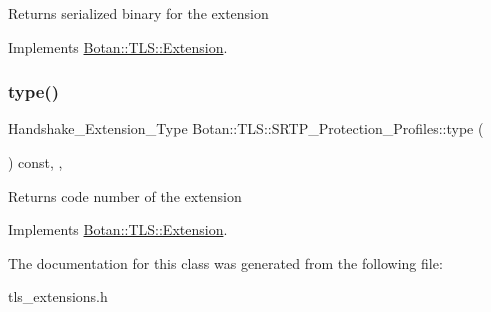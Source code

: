 \begin{DoxyReturn}{Returns}
serialized binary for the extension 
\end{DoxyReturn}


Implements \hyperlink{class_botan_1_1_t_l_s_1_1_extension_a56788726ad2526db54e5a26039cb69db}{Botan\+::\+T\+L\+S\+::\+Extension}.

\mbox{\label{class_botan_1_1_t_l_s_1_1_s_r_t_p___protection___profiles_a7d0e938631996e86ceab9f94092f9119}} 
\subsubsection{\texorpdfstring{type()}{type()}}
{\footnotesize\ttfamily Handshake\+\_\+\+Extension\+\_\+\+Type Botan\+::\+T\+L\+S\+::\+S\+R\+T\+P\+\_\+\+Protection\+\_\+\+Profiles\+::type (\begin{DoxyParamCaption}{ }\end{DoxyParamCaption}) const\hspace{0.3cm}{\ttfamily [inline]}, {\ttfamily [override]}, {\ttfamily [virtual]}}

\begin{DoxyReturn}{Returns}
code number of the extension 
\end{DoxyReturn}


Implements \hyperlink{class_botan_1_1_t_l_s_1_1_extension_ac8819b312ce604453225e7b4f7c373ec}{Botan\+::\+T\+L\+S\+::\+Extension}.



The documentation for this class was generated from the following file\+:\begin{DoxyCompactItemize}
\item 
tls\+\_\+extensions.\+h\end{DoxyCompactItemize}
